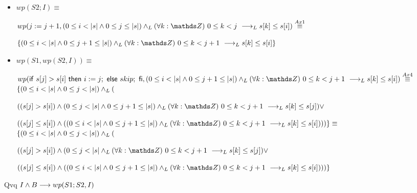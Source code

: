 \documentclass{article}
\begin{document}
\begin{itemize}
    \item $wp(S2; I) \equiv$

    $wp(j:= j+1, (0 \leq i < \longitud{s} \wedge 0 \leq j \leq \longitud{s}) \yLuego \paraTodo{k}{0}{j} \implicaLuego s[k] \leq s[i]) \stackrel{Ax1}{\equiv}$

    $\{(0 \leq i < \longitud{s} \wedge 0 \leq j+1 \leq \longitud{s}) \yLuego \paraTodo{k}{0}{j+1} \implicaLuego s[k] \leq s[i] \}$

    \item $wp(S1, wp(S2, I)) \equiv$

    $wp(\IfThenElse{s[j] > s[i]}{i:=j;}{skip;}, (0 \leq i < \longitud{s} \wedge 0 \leq j+1 \leq \longitud{s}) \yLuego \paraTodo{k}{0}{j+1} \implicaLuego s[k] \leq s[i])\stackrel{Ax4}{\equiv}$\\

    $\{ (0 \leq i < |s| \wedge 0 \leq j < |s|) \land _L ($

    $ ((s[j] > s[i]) \wedge (0 \leq j < \longitud{s} \wedge 0 \leq j+1 \leq \longitud{s}) \yLuego \paraTodo{k}{0}{j+1} \implicaLuego s[k] \leq s[j] ) \vee$

    $ ((s[j] \leq s[i]) \wedge ((0 \leq i < \longitud{s} \wedge 0 \leq j+1 \leq \longitud{s}) \yLuego \paraTodo{k}{0}{j+1} \implicaLuego s[k] \leq s[i]))) \}\equiv$ \\

    $\{ (0 \leq i < |s| \wedge 0 \leq j < |s|) \land _L ($

    $ ((s[j] > s[i]) \wedge (0 \leq j < \longitud{s} \yLuego \paraTodo{k}{0}{j+1} \implicaLuego s[k] \leq s[j] ) \vee$

    $ ((s[j] \leq s[i]) \wedge ((0 \leq i < \longitud{s} \wedge 0 \leq j+1 \leq \longitud{s}) \yLuego \paraTodo{k}{0}{j+1} \implicaLuego s[k] \leq s[i]))) \} $

\end{itemize}

Qvq $I \wedge B \longrightarrow wp(S1;S2, I)$
\end{document}
